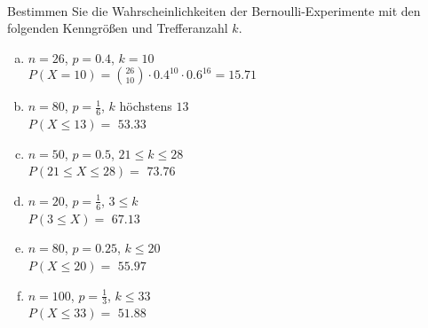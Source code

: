 \begin{aufgabe} ~ \\ 
Bestimmen Sie die Wahrscheinlichkeiten der Bernoulli-Experimente mit den folgenden Kenngrößen und Trefferanzahl $k$.\begin{multicols}{2} 
\begin{enumerate}[a)] 
\item 
$n=26$, $p=0.4$, $k=10$\\ 
$P(X=10)=\binom{26}{10}\cdot0.4^{10}\cdot0.6^{16}=15.71$
\item 
$n=80$, $p=\frac{1}{6}$, $k$ höchstens $13$\\ 
$P(X \leq 13)=$ $53.33$
\item 
$n=50$, $p=0.5$, $21\leq k \leq 28$\\ 
$P(21\leq X \leq 28)=$ $73.76$
\item 
$n=20$, $p=\frac{1}{6}$, $3\leq k $\\ 
$P(3\leq X)=$ $67.13$
\item 
$n=80$, $p=0.25$, $k \leq 20$\\ 
$P(X \leq 20)=$ $55.97$
\item 
$n=100$, $p=\frac{1}{3}$, $k \leq 33$\\ 
$P(X \leq 33)=$ $51.88$
\end{enumerate} 
\end{multicols} 
\end{aufgabe} 
